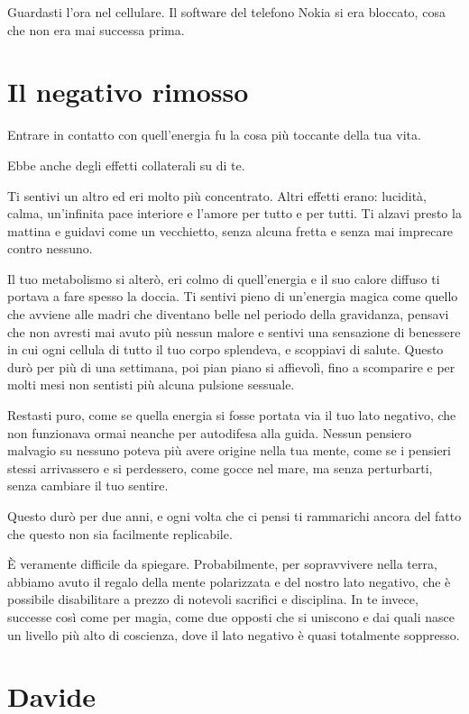 Guardasti l'ora nel cellulare. Il software del telefono Nokia si era bloccato, cosa che non era mai successa prima.

\section{Il negativo rimosso}
\label{il_negativo_rimosso}

Entrare in contatto con quell'energia fu la cosa più toccante della tua vita.

Ebbe anche degli effetti collaterali su di te.

Ti sentivi un altro ed eri molto più concentrato. Altri effetti erano: lucidità, calma, un'infinita pace interiore e l'amore per tutto e per tutti. Ti alzavi presto la mattina e guidavi come un vecchietto, senza alcuna fretta e senza mai imprecare contro nessuno.

Il tuo metabolismo si alterò, eri colmo di quell'energia e il suo calore diffuso ti portava a fare spesso la doccia. Ti sentivi pieno di un'energia magica come quello che avviene alle madri che diventano belle nel periodo della gravidanza, pensavi che non avresti mai avuto più nessun malore e sentivi una sensazione di benessere in cui ogni cellula di tutto il tuo corpo splendeva, e scoppiavi di salute. Questo durò per più di una settimana, poi pian piano si affievolì, fino a scomparire e per molti mesi non sentisti più alcuna pulsione sessuale.

Restasti puro, come se quella energia si fosse portata via il tuo lato negativo, che non funzionava ormai neanche per autodifesa alla guida. Nessun pensiero malvagio su nessuno poteva più avere origine nella tua mente, come se i pensieri stessi arrivassero e si perdessero, come gocce nel mare, ma senza perturbarti, senza cambiare il tuo sentire.

Questo durò per due anni, e ogni volta che ci pensi ti rammarichi ancora del fatto che questo non sia facilmente replicabile.

È veramente difficile da spiegare. Probabilmente, per sopravvivere nella terra, abbiamo avuto il regalo della mente polarizzata e del nostro lato negativo, che è possibile disabilitare a prezzo di notevoli sacrifici e disciplina. In te invece, successe così come per magia, come due opposti che si uniscono e dai quali nasce un livello più alto di coscienza, dove il lato negativo è quasi totalmente soppresso.

\section{Davide}
\label{maurizio}

